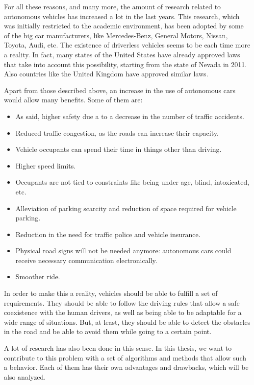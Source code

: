 For all these reasons, and many more, the amount of research related to autonomous vehicles has increased a lot in the last years. This research, which was initially restricted to the academic environment, has been adopted by some of the big car manufacturers, like Mercedes-Benz, General Motors, Nissan, Toyota, Audi, etc. The existence of driverless vehicles seems to be each time more a reality. In fact, many states of the United States have already approved laws that take into account this possibility, starting from the state of Nevada in 2011. Also countries like the United Kingdom have approved similar laws.

Apart from those described above, an increase in the use of autonomous cars would allow many benefits. Some of them are:
\begin{itemize}
 \item As said, higher safety due a to a decrease in the number of traffic accidents.
 \item Reduced traffic congestion, as the roads can increase their capacity.
 \item Vehicle occupants can spend their time in things other than driving.
 \item Higher speed limits.
 \item Occupants are not tied to constraints like being under age, blind, intoxicated, etc.
 \item Alleviation of parking scarcity and reduction of space required for vehicle parking.
 \item Reduction in the need for traffic police and vehicle insurance.
 \item Physical road signs will not be needed anymore: autonomous cars could receive necessary communication electronically.
 \item Smoother ride.
\end{itemize}

In order to make this a reality, vehicles should be able to fulfill a set of requirements. They should be able to follow the driving rules that allow a safe coexistence with the human drivers, as well as being able to be adaptable for a wide range of situations. But, at least, they should be able to detect the obstacles in the road and be able to avoid them while going to a certain point. 

A lot of research has also been done in this sense. In this thesis, we want to contribute to this problem with a set of algorithms and methods that allow such a behavior. Each of them has their own advantages and drawbacks, which will be also analyzed. 

